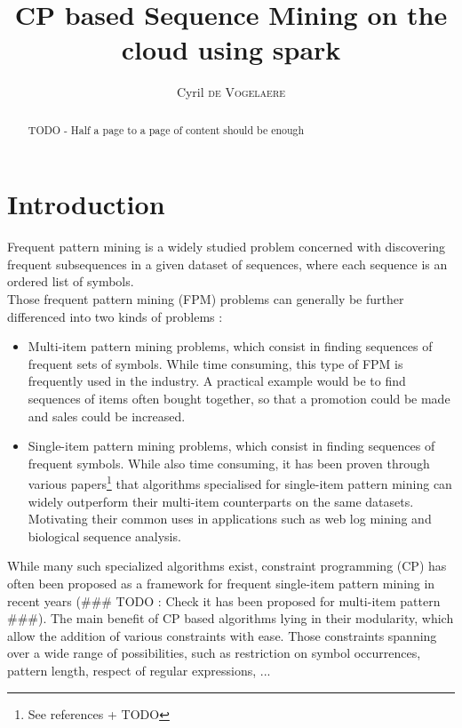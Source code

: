 \documentclass{eplmastersthesis}
\title{CP based Sequence Mining on the cloud using spark}	%
\author{Cyril \textsc{de Vogelaere}}	%
\begin{document}
\begin{singlespacing}
\maketitle					%
\end{singlespacing}

\tableofcontents
\newpage
\listoffigures
\listoftables
\newpage

\begin{abstract}
TODO - Half a page to a page of content should be enough
\end{abstract}
\newpage


\section{Introduction}

Frequent pattern mining is a widely studied problem concerned with discovering frequent subsequences in a given dataset of sequences, where each sequence is an ordered list of symbols. \\
Those frequent pattern mining (FPM) problems can generally be further differenced into two kinds of problems :

\begin{itemize}
\item Multi-item pattern mining problems, which consist in finding sequences of frequent sets of symbols. While time consuming, this type of FPM is frequently used in the industry. A practical example would be to find sequences of items often bought together, so that a promotion could be made and sales could be increased.
\item Single-item pattern mining problems, which consist in finding sequences of frequent symbols. While also time consuming, it has been proven through various papers\footnote{See references + TODO} that algorithms specialised for single-item pattern mining can widely outperform their multi-item counterparts on the same datasets. Motivating their common uses in applications such as web log mining and biological sequence analysis.
\end{itemize}

While many such specialized algorithms exist, constraint programming (CP) has often been proposed as a framework for frequent single-item pattern mining in recent years (\#\#\# TODO : Check it has been proposed for multi-item pattern \#\#\#). The main benefit of CP based algorithms lying in their modularity, which allow the addition of various constraints with ease. Those constraints spanning over a wide range of possibilities, such as restriction on symbol occurrences, pattern length, respect of regular expressions, ... \newline
\end{document}
